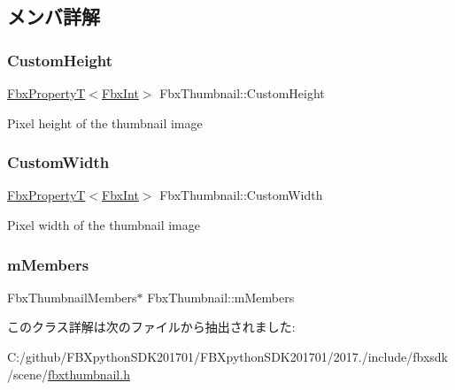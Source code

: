 \subsection{メンバ詳解}
\mbox{\label{class_fbx_thumbnail_a42a590e1eb6e45788e3afb50d81824ec}} 
\subsubsection{\texorpdfstring{Custom\+Height}{CustomHeight}}
{\footnotesize\ttfamily \hyperlink{class_fbx_property_t}{Fbx\+PropertyT}$<$\hyperlink{fbxtypes_8h_a088fa96de3b0b3ea69f0f6afef525dfb}{Fbx\+Int}$>$ Fbx\+Thumbnail\+::\+Custom\+Height}



Pixel height of the thumbnail image 

\mbox{\label{class_fbx_thumbnail_a791822f52e133326b3a366ab6cda9757}} 
\subsubsection{\texorpdfstring{Custom\+Width}{CustomWidth}}
{\footnotesize\ttfamily \hyperlink{class_fbx_property_t}{Fbx\+PropertyT}$<$\hyperlink{fbxtypes_8h_a088fa96de3b0b3ea69f0f6afef525dfb}{Fbx\+Int}$>$ Fbx\+Thumbnail\+::\+Custom\+Width}



Pixel width of the thumbnail image 

\mbox{\label{class_fbx_thumbnail_afde37b4e171f395489d254b61f42a6cd}} 
\subsubsection{\texorpdfstring{m\+Members}{mMembers}}
{\footnotesize\ttfamily Fbx\+Thumbnail\+Members$\ast$ Fbx\+Thumbnail\+::m\+Members\hspace{0.3cm}{\ttfamily [protected]}}



このクラス詳解は次のファイルから抽出されました\+:\begin{DoxyCompactItemize}
\item 
C\+:/github/\+F\+B\+Xpython\+S\+D\+K201701/\+F\+B\+Xpython\+S\+D\+K201701/2017./include/fbxsdk/scene/\hyperlink{fbxthumbnail_8h}{fbxthumbnail.\+h}\end{DoxyCompactItemize}
